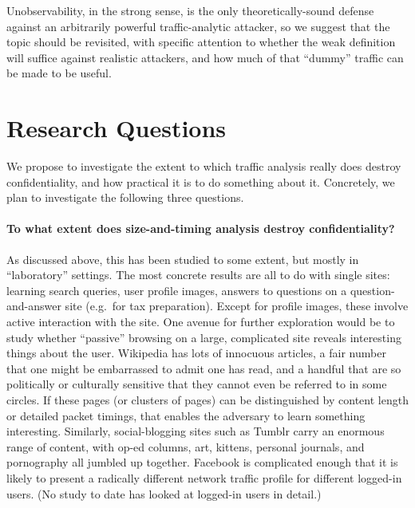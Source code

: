 \documentclass[oneside,tinymargin]{zarticle}
\begin{document}
\begin{multicols}{2}
Unobservability, in the strong sense, is the only theoretically-sound
defense against an arbitrarily powerful traffic-analytic attacker,
so we suggest that the topic should be revisited, with specific
attention to whether the weak definition will suffice against
realistic attackers, and how much of that “dummy” traffic can be made
to be useful.

\section{Research Questions}

We propose to investigate the extent to which traffic analysis really
does destroy confidentiality, and how practical it is to do something
about it.  Concretely, we plan to investigate the following three
questions.

\paragraph{To what extent does size-and-timing analysis destroy
  confidentiality?}  As discussed above, this has been studied to some
extent, but mostly in “laboratory” settings.  The most concrete
results are all to do with single sites: learning search queries, user
profile images, answers to questions on a question-and-answer site
(e.g.\ for tax preparation).  Except for profile images, these involve
active interaction with the site.  One avenue for further exploration
would be to study whether “passive” browsing on a large, complicated
site reveals interesting things about the user.  Wikipedia has lots of
innocuous articles, a fair number that one might be embarrassed to
admit one has read, and a handful that are so politically or
culturally sensitive that they cannot even be referred to in some
circles.  If these pages (or clusters of pages) can be distinguished
by content length or detailed packet timings, that enables the
adversary to learn something interesting.  Similarly, social-blogging
sites such as Tumblr carry an enormous range of content, with op-ed
columns, art, kittens, personal journals, and pornography all jumbled
up together.  Facebook is complicated enough that it is likely to
present a radically different network traffic profile for different
logged-in users.  (No study to date has looked at logged-in users in
detail.)


\end{multicols}
\end{document}
